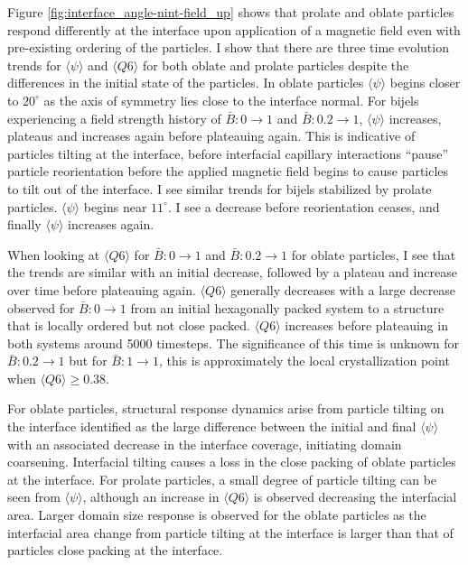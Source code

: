 Figure \ref{fig:interface_angle-nint-field_up} shows that
prolate and oblate particles respond differently at the interface upon application of a magnetic field
even with pre-existing ordering of the particles. I
show that there are three time evolution trends for
$\langle \psi \rangle$ and $\langle Q6 \rangle$ for both oblate and
prolate particles despite the differences in the initial state of the
particles. In oblate particles $\langle \psi \rangle$ begins closer to
$20 ^{\circ}$ as the axis of symmetry lies close to the interface
normal. For bijels experiencing a field strength history of
$\bar{B}: 0 \rightarrow 1$ and $\bar{B}: 0.2 \rightarrow 1$,
$\langle \psi \rangle$ increases, plateaus and increases again before
plateauing again. This is indicative of particles tilting at the
interface, before interfacial capillary interactions ``pause'' particle
reorientation before the applied magnetic field begins to cause
particles to tilt out of the interface. I see similar trends for bijels
stabilized by prolate particles. $\langle \psi \rangle$ begins near
$11 ^{\circ}$. I see a decrease before reorientation ceases, and
finally $\langle \psi \rangle$ increases again.

When looking at $\langle Q6 \rangle$ for $\bar{B}: 0 \rightarrow 1$
and $\bar{B}: 0.2 \rightarrow 1$ for oblate particles, I see that the
trends are similar with an initial decrease, followed by a plateau and
increase over time before plateauing again. $\langle Q6 \rangle$
generally decreases with a large decrease observed for
\(\bar{B}: 0 \rightarrow 1\) from an initial hexagonally packed system
to a structure that is locally ordered but not close packed. $\langle Q6 \rangle$ increases before plateauing 
in both systems around 5000 timesteps. The significance of
this time is unknown for $\bar{B}: 0.2 \rightarrow 1$ but for
$\bar{B}: 1 \rightarrow 1$, this is approximately the local
crystallization point when $\langle Q6 \rangle \geq 0.38$.

For oblate particles, structural response dynamics
arise from particle tilting on the interface identified as the large
difference between the initial and final $\langle \psi \rangle$ with
an associated decrease in the interface coverage, initiating domain
coarsening. Interfacial tilting causes a loss in the
close packing of oblate particles at the interface. For prolate
particles, a small degree of particle tilting can be seen
from $\langle \psi \rangle$, although an increase in $\langle Q6 \rangle$ is observed
decreasing the interfacial area. Larger domain size response is
observed for the oblate particles as the interfacial area change from
particle tilting at the interface is larger than that of particles close
packing at the interface.

